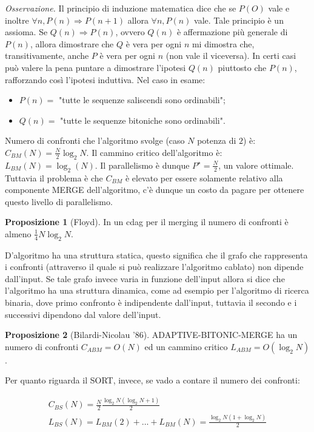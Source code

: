 \documentclass[a4paper,portrait,12pt]{article}
\theoremstyle{definition}
\newtheorem{proposition}{Proposizione}
\begin{document}
\textit{Osservazione.} Il principio di induzione matematica dice che se $P(O)$ vale e inoltre $\forall n, P(n) \Rightarrow P(n+1)$ allora $\forall n, P(n)$ vale.
Tale principio è un assioma.
Se $Q(n) \Rightarrow P(n)$, ovvero $Q(n)$ è affermazione più
generale di $P(n)$, allora dimostrare che $Q$ è vera per ogni $n$ mi dimostra che, transitivamente, anche $P$
è vera per ogni $n$ (non vale il viceversa).
In certi casi può valere la pena puntare a dimostrare l’ipotesi $Q(n)$ piuttosto che $P(n)$, rafforzando così l’ipotesi induttiva.
Nel caso in esame:
\begin{itemize}
\item $P(n) = $ "tutte le sequenze saliscendi sono ordinabili";
\item $Q(n) = $ "tutte le sequenze bitoniche sono ordinabili".
\end{itemize}
Numero di confronti che l’algoritmo svolge (caso $N$ potenza di $2$) è: $C_{BM} (N) = \frac{N}{2} \log_2{N}$.
Il cammino critico dell’algoritmo è: $L_{BM}(N) = \log_2(N)$.
Il parallelismo è dunque $P^{\star} = \frac{N}{2}$, un valore ottimale.
Tuttavia il problema è che $C_{BM}$ è elevato per essere solamente relativo alla componente MERGE dell’algoritmo, c’è dunque un costo da pagare per ottenere questo livello di parallelismo.

\begin{proposition}[Floyd]
In un cdag per il merging il numero di confronti è almeno $\frac{1}{4} N \log_2 N$.
\end{proposition}

D’algoritmo ha una struttura statica, questo significa che il grafo che rappresenta i confronti (attraverso
il quale si può realizzare l’algoritmo cablato) non dipende dall’input. Se tale grafo invece varia in
funzione dell’input allora si dice che l’algoritmo ha una struttura dinamica, come ad esempio per
l’algoritmo di ricerca binaria, dove primo confronto è indipendente dall’input, tuttavia il secondo e i
successivi dipendono dal valore dell’input.

\begin{proposition}[Bilardi-Nicolau '86]
ADAPTIVE-BITONIC-MERGE ha un numero di confronti $C_{ABM} = O(N)$ ed un cammino critico $L_{ABM} = O(\log_2 N)$.
\end{proposition}

Per quanto riguarda il SORT, invece, se vado a contare il numero dei confronti:

\begin{gather*}
C_{BS}(N) = \frac{N}{2} \frac{\log_2 N (\log_2 N + 1)}{2}\\
L_{BS}(N) = L_{BM}(2) + ... + L_{BM}(N) = \frac{\log_2 N (1 + \log_2 N)}{2}
\end{gather*}
\end{document}
